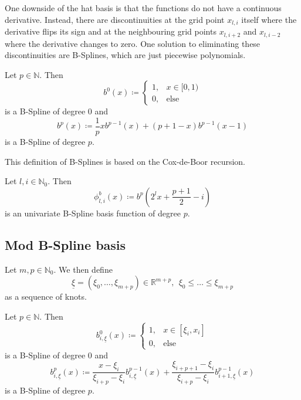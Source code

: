 \documentclass[
  a4paper,  %
  twoside,  %
  bibliography=totoc,
  headsepline,
  cleardoublepage=empty,
  parskip=half,
  draft=false
]{scrbook}
\begin{document}
One downside of the hat basis is that the functions do not have a continuous derivative.
Instead, there are discontinuities at the grid point $x_{l,i}$ itself where the derivative flips its sign and at the neighbouring grid points $x_{l,i+2}$ and $x_{l,i-2}$ where the derivative changes to zero.
One solution to eliminating these discontinuities are B-Splines, which are just piecewise polynomials.
\begin{definition}[B-Splines]
Let $p \in \mathds{N}$.
Then
\begin{equation}
b^0(x) \coloneqq
\begin{cases}
    1, & x \in [0,1) \\
   0, & \text{else}
\end{cases}
\end{equation}
is a B-Spline of degree $0$ and
\begin{equation}
b^p(x) \coloneqq \frac{1}{p} xb^{p-1}(x) + (p + 1 - x) b^{p-1}(x-1) 
\end{equation}
is a B-Spline of degree $p$.
\end{definition}
This definition of B-Splines is based on the Cox-de-Boor recursion.

\begin{definition}
Let $l,i \in \mathds{N}_0$.
Then
\begin{equation}
\phi^b_{l,i}(x) \coloneqq b^p \left( 2^l x + \frac{p+1}{2} -i \right)
\end{equation}
is an univariate B-Spline basis function of degree $p$.
\end{definition}

\subsection{Mod B-Spline basis}

\begin{definition}[Knots]
Let $m,p \in \mathds{N}_0$.
We then define
\begin{equation}
\underline{\xi}=(\xi_0, \dots, \xi_{m + p}) \in \mathds{R}^{m + p}, ~~ \xi_0 \leq \dots \leq \xi_{m + p}
\end{equation}
as a sequence of knots.
\end{definition}

\begin{definition}[B-Splines]
Let $p \in \mathds{N}$.
Then
\begin{equation}
b^0_{i,\underline{\xi}}(x) \coloneqq
\begin{cases}
    1, & x \in [\xi_i,x_i] \\
   0, & \text{else}
\end{cases}
\end{equation}
is a B-Spline of degree $0$ and
\begin{equation}
b_{i,\underline{\xi}}^p(x) \coloneqq \frac{x - \xi_i}{\xi_{i + p} - \xi_i} b_{i,\underline{\xi}}^{p-1}(x) + \frac{\xi_{i+p+1} - \xi_i}{\xi_{i + p} - \xi_i} b_{i+1,\underline{\xi}}^{p-1}(x) 
\end{equation}
is a B-Spline of degree $p$.
\end{definition}
\end{document}
